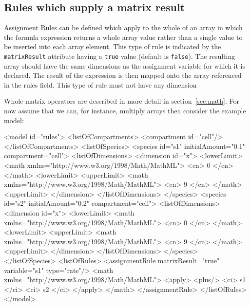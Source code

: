 \documentclass{cekarticle}
\begin{document}
\subsection{Rules which supply a matrix result}

Assignment Rules can be defined which apply to the whole of an array
in which the formula expression returns a whole
array value rather than a single value to be inserted into each
array element.  This type of rule is indicated by the \texttt{matrixResult}
attribute having a \texttt{true} value (default is \texttt{false}).
The resulting array should have the same dimensions as the assignment variable
for which it is declared.  The result of the expression is then mapped onto
the array referenced in the rules  field.
This type of rule must not have any dimension

Whole matrix operators are described in
more detail in section~\ref{sec:math}.  For now assume that we
can, for instance, multiply arrays then consider the example
model:

\begin{example}
<model id="rules">
    <listOfCompartments>
        <compartment id="cell"/>
    </listOfCompartments>
    <listOfSpecies>
        <species id="s1" initialAmount="0.1" compartment="cell">
            <listOfDimensions>
                <dimension id="x">
                    <lowerLimit>
                        <math xmlns="http://www.w3.org/1998/Math/MathML">
                            <cn> 0 </cn>
                        </math>
                    <lowerLimit>
                    <upperLimit>
                        <math xmlns="http://www.w3.org/1998/Math/MathML">
                            <cn> 9 </cn>
                        </math>
                    <upperLimit>
                </dimension>
            </listOfDimensions>
        </species>
        <species id="s2" initialAmount="0.2" compartment="cell">
            <listOfDimensions>
                <dimension id="x">
                    <lowerLimit>
                        <math xmlns="http://www.w3.org/1998/Math/MathML">
                            <cn> 0 </cn>
                        </math>
                    <lowerLimit>
                    <upperLimit>
                        <math xmlns="http://www.w3.org/1998/Math/MathML">
                            <cn> 9 </cn>
                        </math>
                    <upperLimit>
                </dimension>
            </listOfDimensions>
        </species>
    </listOfSpecies>
    <listOfRules>
        <assignmentRule matrixResult="true" variable="s1" type="rate"/>
            <math xmlns="http://www.w3.org/1998/Math/MathML">
                <apply>
                    <plus/>
                    <ci> s1 </ci>
                    <ci> s2 </ci>
                </apply>
            </math>
        </assignmentRule>
    </listOfRules>
</model>
\end{example}
\end{document}
